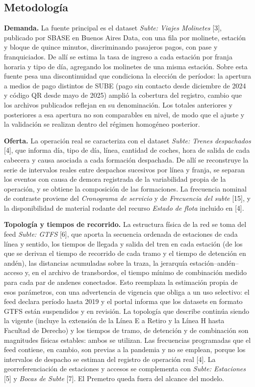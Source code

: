 \documentclass{article}
\begin{document}
\subsection{Metodología}

\textbf{Demanda.} La fuente principal es el dataset \textit{Subte: Viajes Molinetes} [3], publicado por
SBASE en Buenos Aires Data, con una fila por molinete, estación y bloque de quince minutos, discriminando
pasajeros pagos, con pase y franquiciados. De allí se estima la tasa de ingreso a cada estación por franja
horaria y tipo de día, agregando los molinetes de una misma estación. Sobre esta fuente pesa una
discontinuidad que condiciona la elección de períodos: la apertura a medios de pago distintos de SUBE (pago
sin contacto desde diciembre de 2024 y código QR desde mayo de 2025) amplió la cobertura del registro, cambio que los archivos
publicados reflejan en su denominación. Los totales anteriores y posteriores a esa apertura no son
comparables en nivel, de modo que el ajuste y la validación se realizan dentro del régimen homogéneo
posterior.

\textbf{Oferta.} La operación real se caracteriza con el dataset \textit{Subte: Trenes despachados} [4],
que informa día, tipo de día, línea, cantidad de coches, hora de salida de cada cabecera y causa asociada a
cada formación despachada. De allí se reconstruye la serie de intervalos reales entre despachos sucesivos
por línea y franja, se separan los eventos con causa de demora registrada de la variabilidad propia de la
operación, y se obtiene la composición de las formaciones. La frecuencia nominal de contraste proviene del
\textit{Cronograma de servicio} y de \textit{Frecuencia del subte} [15], y la disponibilidad de material
rodante del recurso \textit{Estado de flota} incluido en [4].

\textbf{Topología y tiempos de recorrido.} La estructura física de la red se toma del feed
\textit{Subte: GTFS} [6], que aporta la secuencia ordenada de estaciones de cada línea y sentido, los
tiempos de llegada y salida del tren en cada estación (de los que se derivan el tiempo de recorrido de
cada tramo y el tiempo de detención en andén), las distancias acumuladas sobre la traza, la jerarquía
estación--andén--acceso y, en el archivo de transbordos, el tiempo mínimo de combinación medido para cada
par de andenes conectados. Esto reemplaza la estimación propia de esos parámetros, con una advertencia de
vigencia que obliga a un uso selectivo: el feed declara período hasta 2019 y el portal informa que los
datasets en formato GTFS están suspendidos y en revisión. La topología que describe continúa siendo la
vigente (incluye la extensión de la Línea E a Retiro y la Línea H hasta Facultad de Derecho) y los tiempos
de tramo, de detención y de combinación son magnitudes físicas estables: ambos se utilizan. Las frecuencias
programadas que el feed contiene, en cambio, son previas a la pandemia y no se emplean, porque los
intervalos de despacho se estiman del registro de operación real [4]. La
georreferenciación de estaciones y accesos se complementa con \textit{Subte: Estaciones} [5] y
\textit{Bocas de Subte} [7]. El Premetro queda fuera del alcance del modelo.
\end{document}
